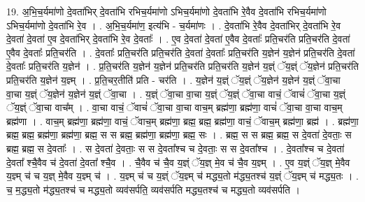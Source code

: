 \documentclass[17pt]{extarticle}
\begin{document}
19. अ॒भि॒च॒र्यमा॑णो दे॒वता॑भिर् दे॒वता॑भि रभिच॒र्यमा॑णो ऽभिच॒र्यमा॑णो दे॒वता॑भि रे॒वैव दे॒वता॑भि रभिच॒र्यमा॑णो ऽभिच॒र्यमा॑णो दे॒वता॑भि रे॒व । . अ॒भि॒च॒र्यमा॑ण॒ इत्य॑भि - च॒र्यमा॑णः । . दे॒वता॑भि रे॒वैव दे॒वता॑भिर् दे॒वता॑भि रे॒व दे॒वता॑ दे॒वता॑ ए॒व दे॒वता॑भिर् दे॒वता॑भि रे॒व दे॒वताः᳚ । . ए॒व दे॒वता॑ दे॒वता॑ ए॒वैव दे॒वताः᳚ प्रति॒चर॑ति प्रति॒चर॑ति दे॒वता॑ ए॒वैव दे॒वताः᳚ प्रति॒चर॑ति । . दे॒वताः᳚ प्रति॒चर॑ति प्रति॒चर॑ति दे॒वता॑ दे॒वताः᳚ प्रति॒चर॑ति य॒ज्ञेन॑ य॒ज्ञेन॑ प्रति॒चर॑ति दे॒वता॑ दे॒वताः᳚ प्रति॒चर॑ति य॒ज्ञेन॑ । . प्र॒ति॒चर॑ति य॒ज्ञेन॑ य॒ज्ञेन॑ प्रति॒चर॑ति प्रति॒चर॑ति य॒ज्ञेन॑ य॒ज्ञ्ं ॅय॒ज्ञ्ं ॅय॒ज्ञेन॑ प्रति॒चर॑ति प्रति॒चर॑ति य॒ज्ञेन॑ य॒ज्ञ्म् । . प्र॒ति॒चर॒तीति॑ प्रति - चर॑ति । . य॒ज्ञेन॑ य॒ज्ञ्ं ॅय॒ज्ञ्ं ॅय॒ज्ञेन॑ य॒ज्ञेन॑ य॒ज्ञ्ं ॅवा॒चा वा॒चा य॒ज्ञ्ं ॅय॒ज्ञेन॑ य॒ज्ञेन॑ य॒ज्ञ्ं ॅवा॒चा । . य॒ज्ञ्ं ॅवा॒चा वा॒चा य॒ज्ञ्ं ॅय॒ज्ञ्ं ॅवा॒चा वाचं॒ ॅवाचं॑ ॅवा॒चा य॒ज्ञ्ं ॅय॒ज्ञ्ं ॅवा॒चा वाच᳚म् । . वा॒चा वाचं॒ ॅवाचं॑ ॅवा॒चा वा॒चा वाच॒म् ब्रह्म॑णा॒ ब्रह्म॑णा॒ वाचं॑ ॅवा॒चा वा॒चा वाच॒म् ब्रह्म॑णा । . वाच॒म् ब्रह्म॑णा॒ ब्रह्म॑णा॒ वाचं॒ ॅवाच॒म् ब्रह्म॑णा॒ ब्रह्म॒ ब्रह्म॒ ब्रह्म॑णा॒ वाचं॒ ॅवाच॒म् ब्रह्म॑णा॒ ब्रह्म॑ । . ब्रह्म॑णा॒ ब्रह्म॒ ब्रह्म॒ ब्रह्म॑णा॒ ब्रह्म॑णा॒ ब्रह्म॒ स स ब्रह्म॒ ब्रह्म॑णा॒ ब्रह्म॑णा॒ ब्रह्म॒ सः । . ब्रह्म॒ स स ब्रह्म॒ ब्रह्म॒ स दे॒वता॑ दे॒वताः॒ स ब्रह्म॒ ब्रह्म॒ स दे॒वताः᳚ । . स दे॒वता॑ दे॒वताः॒ स स दे॒वता᳚श्च च दे॒वताः॒ स स दे॒वता᳚श्च । . दे॒वता᳚श्च च दे॒वता॑ दे॒वता᳚ श्चै॒वैव च॑ दे॒वता॑ दे॒वता᳚ श्चै॒व । . चै॒वैव च॑ चै॒व य॒ज्ञ्ं ॅय॒ज्ञ् मे॒व च॑ चै॒व य॒ज्ञ्म् । . ए॒व य॒ज्ञ्ं ॅय॒ज्ञ् मे॒वैव य॒ज्ञ्म् च॑ च य॒ज्ञ् मे॒वैव य॒ज्ञ्म् च॑ । . य॒ज्ञ्म् च॑ च य॒ज्ञ्ं ॅय॒ज्ञ्म् च॑ मद्ध्य॒तो म॑द्ध्य॒तश्च॑ य॒ज्ञ्ं ॅय॒ज्ञ्म् च॑ मद्ध्य॒तः । . च॒ म॒द्ध्य॒तो म॑द्ध्य॒तश्च॑ च मद्ध्य॒तो व्यव॑सर्पति॒ व्यव॑सर्पति मद्ध्य॒तश्च॑ च मद्ध्य॒तो व्यव॑सर्पति । \newline
\end{document}
